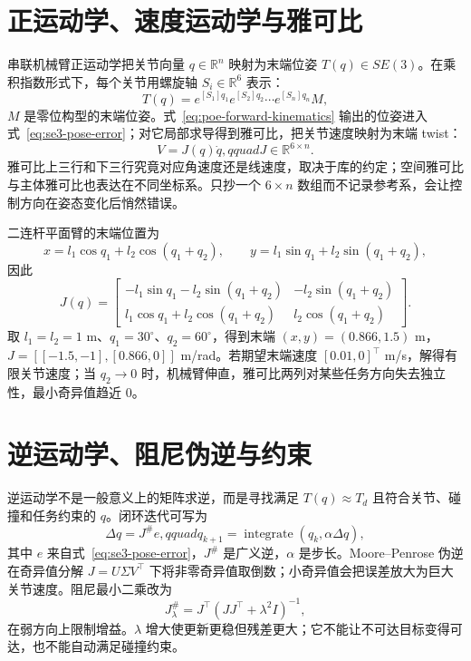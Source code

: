 \section{正运动学、速度运动学与雅可比}

串联机械臂正运动学把关节向量 $q\in\mathbb{R}^n$ 映射为末端位姿 $T(q)\in SE(3)$。在乘积指数形式下，每个关节用螺旋轴 $S_i\in\mathbb{R}^6$ 表示：
\begin{equation}
T(q)=e^{[S_1]q_1}e^{[S_2]q_2}\cdots e^{[S_n]q_n}M,
\label{eq:poe-forward-kinematics}
\end{equation}
$M$ 是零位构型的末端位姿。式~\eqref{eq:poe-forward-kinematics} 输出的位姿进入式~\eqref{eq:se3-pose-error}；对它局部求导得到雅可比，把关节速度映射为末端 twist：
\begin{equation}
V=J(q)\dot q,qquad J\in\mathbb{R}^{6\times n}.
\label{eq:velocity-jacobian}
\end{equation}
雅可比上三行和下三行究竟对应角速度还是线速度，取决于库的约定；空间雅可比与主体雅可比也表达在不同坐标系。只抄一个 $6\times n$ 数组而不记录参考系，会让控制方向在姿态变化后悄然错误。

二连杆平面臂的末端位置为
\begin{equation}
x=l_1\cos q_1+l_2\cos(q_1+q_2),\qquad
y=l_1\sin q_1+l_2\sin(q_1+q_2),
\end{equation}
因此
\begin{equation}
J(q)=
\begin{bmatrix}
-l_1\sin q_1-l_2\sin(q_1+q_2)&-l_2\sin(q_1+q_2)\\
l_1\cos q_1+l_2\cos(q_1+q_2)&l_2\cos(q_1+q_2)
\end{bmatrix}.
\label{eq:two-link-jacobian}
\end{equation}
取 $l_1=l_2=1$ m、$q_1=30^\circ$、$q_2=60^\circ$，得到末端 $(x,y)=(0.866,1.5)$ m，$J=[[-1.5,-1],[0.866,0]]$ m/rad。若期望末端速度 $[0.01,0]^\top$ m/s，解得有限关节速度；当 $q_2\to0$ 时，机械臂伸直，雅可比两列对某些任务方向失去独立性，最小奇异值趋近 0。

\section{逆运动学、阻尼伪逆与约束}

逆运动学不是一般意义上的矩阵求逆，而是寻找满足 $T(q)\approx T_d$ 且符合关节、碰撞和任务约束的 $q$。闭环迭代可写为
\begin{equation}
\Delta q=J^\#e,qquad q_{k+1}=\operatorname{integrate}(q_k,\alpha\Delta q),
\label{eq:ik-update}
\end{equation}
其中 $e$ 来自式~\eqref{eq:se3-pose-error}，$J^\#$ 是广义逆，$\alpha$ 是步长。Moore--Penrose 伪逆在奇异值分解 $J=U\Sigma V^\top$ 下将非零奇异值取倒数；小奇异值会把误差放大为巨大关节速度。阻尼最小二乘改为
\begin{equation}
J^\#_\lambda=J^\top(JJ^\top+\lambda^2I)^{-1},
\label{eq:damped-pseudoinverse}
\end{equation}
在弱方向上限制增益。$\lambda$ 增大使更新更稳但残差更大；它不能让不可达目标变得可达，也不能自动满足碰撞约束。

